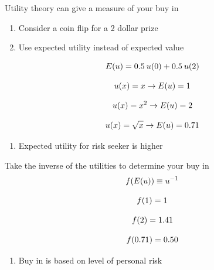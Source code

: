 \documentclass[aspectratio=1610,pdftex,dvipsnames,compress,xcolor={dvipsnames}]{beamer}
\begin{document}
\addtocounter{framenumber}{-1}
\begin{frame}{Utility theory can give a measure of your buy in}
    \begin{enumerate}[series=outerlist,topsep=0pt,itemsep=5pt,leftmargin=*,label=(\arabic*)]
        \item[]Consider a coin flip for a 2 dollar prize
        \item[]Use expected utility instead of expected value
    \end{enumerate}

    \begin{equation}
        \LARGE
        E(u) = 0.5 \: u(0) + 0.5 \: u(2)
    \end{equation}

    \begin{equation}
        \LARGE
        u(x)=x \rightarrow E(u) = 1
    \end{equation}

    \begin{equation}
        \LARGE
        u(x)=x^2 \rightarrow E(u) = 2
    \end{equation}

    \begin{equation}
        \LARGE
        u(x)=\sqrt{x} \rightarrow E(u) = 0.71
    \end{equation}

    \begin{enumerate}[series=outerlist,topsep=0pt,itemsep=5pt,leftmargin=*,label=(\arabic*)]
        \item[]Expected utility for risk seeker is higher
    \end{enumerate}
\end{frame}


\begin{frame}{Take the inverse of the utilities to determine your buy in}
    \begin{equation}
        \LARGE
        f(E(u)) \equiv u^{-1}
    \end{equation}

    \begin{equation}
        \LARGE
        f(1)= 1
    \end{equation}

    \begin{equation}
        \LARGE
        f(2)= 1.41
    \end{equation}

    \begin{equation}
        \LARGE
        f(0.71)= 0.50
    \end{equation}

    \begin{enumerate}[series=outerlist,topsep=0pt,itemsep=5pt,leftmargin=*,label=(\arabic*)]
        \item[]Buy in is based on level of personal risk
    \end{enumerate}
\end{frame}
\end{document}
